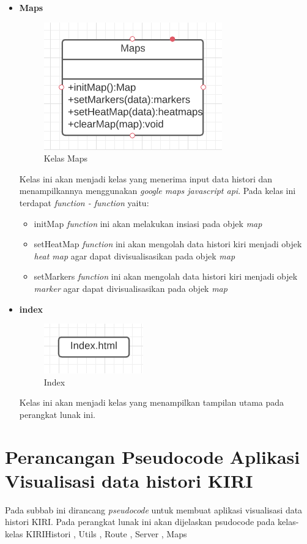 \begin{itemize}
    \item \textbf{Maps}
        \begin{figure}[H]
        	\centering  
        	\includegraphics[scale=1]{Gambar/Maps-Class.PNG}  
        	\caption[Kelas Maps]{Kelas Maps} 
        	\label{fig:mapClass} 
    \end{figure}
    Kelas ini akan menjadi kelas yang menerima input data histori dan menampilkannya menggunakan \textit{google maps javascript api}.
    Pada kelas ini terdapat \textit{function - function} yaitu:
    \begin{itemize}
        \item initMap \textit{function} ini akan melakukan insiasi pada objek \textit{map}
        \item setHeatMap \textit{function} ini akan mengolah data histori kiri menjadi objek \textit{heat map}  agar dapat divisualisasikan pada objek \textit{map}
        \item setMarkers \textit{function} ini akan mengolah data histori kiri menjadi objek \textit{marker} agar dapat divisualisasikan pada objek \textit{map} 
    \end{itemize}

    \item \textbf{index}
           \begin{figure}[H]
        	\centering  
        	\includegraphics[scale=1]{Gambar/Index.PNG}  
        	\caption[Index]{Index} 
        	\label{fig:index} 
    \end{figure}
    Kelas ini akan menjadi kelas yang menampilkan tampilan utama pada perangkat lunak ini.
\end{itemize}

\section{Perancangan Pseudocode Aplikasi Visualisasi data histori KIRI}
Pada subbab ini dirancang \textit{pseudocode} untuk membuat aplikasi visualisasi data histori KIRI. Pada perangkat lunak ini akan dijelaskan psudocode pada kelas-kelas KIRIHistori , Utils , Route , Server , Maps



